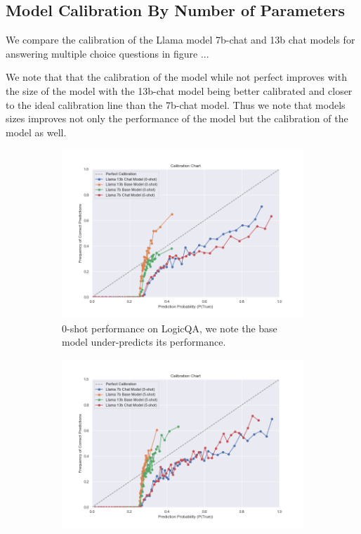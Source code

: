 \documentclass[11pt]{article}
\begin{document}
\subsection{Model Calibration By Number of Parameters}

We compare the calibration of the Llama \cite{touvron2023llama} model 
7b-chat and 13b chat models for answering multiple choice questions in 
figure ... 

We note that that the calibration of the model while not perfect improves 
with the size of the model with the 13b-chat model being better calibrated 
and closer to the ideal calibration line than the 7b-chat model. Thus we 
note that models sizes improves not only the performance of the model but
the calibration of the model as well.


\begin{figure}
     \centering
     \begin{subfigure}[b]{0.49\textwidth}
         \centering \includegraphics[width=1.3\textwidth]{figures/0-shot-logic-qa.png}
         \caption{0-shot performance on LogicQA, we note the base model under-predicts its performance.}
         \label{fig:0-shot-MMLU}
     \end{subfigure}
     \hfill
     \begin{subfigure}[b]{0.49\textwidth}
         \centering
         \includegraphics[width=1.3\textwidth]{figures/5-shot-logic-qa.png}

\end{subfigure}
\end{figure}
\end{document}

